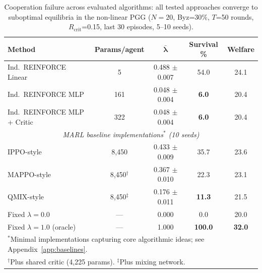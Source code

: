 \documentclass{article}
\begin{document}
\begin{table}[t]
\centering
\caption{Cooperation failure across evaluated algorithms: all tested approaches converge to suboptimal equilibria in the non-linear PGG ($N{=}20$, Byz=30\%, $T$=50 rounds, $R_{\text{crit}}$=0.15, last 30 episodes, 5--10 seeds).\protect\footnotemark}
\label{tab:emergence}
\begin{tabular}{lcccc}
\toprule
\textbf{Method} & \textbf{Params/agent} & $\boldsymbol{\bar{\lambda}}$ & \textbf{Survival \%} & \textbf{Welfare} \\
\midrule
Ind.\ REINFORCE Linear & 5 & 0.488 $\pm$ 0.007 & 54.0 & 24.1 \\
Ind.\ REINFORCE MLP & 161 & 0.048 $\pm$ 0.004 & \textbf{6.0} & 20.4 \\
Ind.\ REINFORCE MLP + Critic & 322 & 0.048 $\pm$ 0.004 & \textbf{6.0} & 20.4 \\
\midrule
\multicolumn{5}{c}{\textit{MARL baseline implementations$^*$ (10 seeds)}} \\
\midrule
IPPO-style~\citep{schulman2017proximal} & 8,450 & 0.433 $\pm$ 0.009 & 35.7 & 23.6 \\
MAPPO-style~\citep{yu2022surprising} & 8,450$^\dagger$ & 0.367 $\pm$ 0.010 & 22.3 & 23.1 \\
QMIX-style~\citep{rashid2018qmix} & 8,450$^\ddagger$ & 0.176 $\pm$ 0.011 & \textbf{11.3} & 21.5 \\
\midrule
Fixed $\lambda=0.0$ & --- & 0.000 & 0.0 & 20.0 \\
Fixed $\lambda=1.0$ (oracle) & --- & 1.000 & \textbf{100.0} & \textbf{32.0} \\
\bottomrule
\multicolumn{5}{l}{\small $^*$Minimal implementations capturing core algorithmic ideas; see Appendix~\ref{app:baselines}.} \\
\multicolumn{5}{l}{\small $^\dagger$Plus shared critic (4,225 params). $^\ddagger$Plus mixing network.} \\
\end{tabular}
\end{table}
\end{document}
